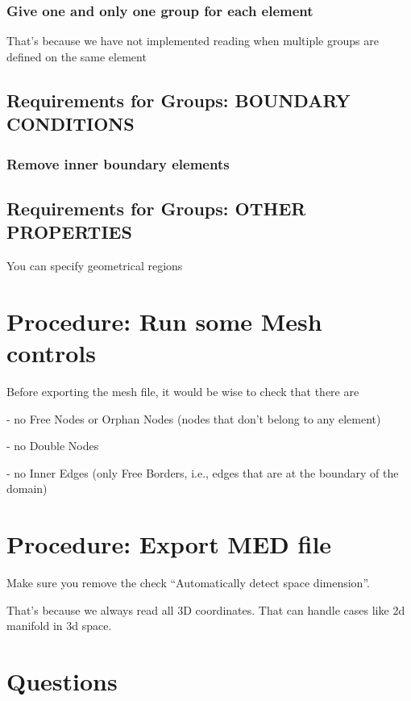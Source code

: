 \documentclass[10pt]{book}
\begin{document}
\subsection{Give one and only one group for each element}

 That's because we have not implemented reading when multiple groups are defined on the same element

\section{Requirements for Groups: BOUNDARY CONDITIONS}

   
\subsection{Remove inner boundary elements}

  
 \section{Requirements for Groups: OTHER PROPERTIES}
 
 You can specify geometrical regions
 
 
  
 \chapter{Procedure: Run some Mesh controls}
 
 Before exporting the mesh file, it would be wise to check that there are 
  
  - no Free Nodes or Orphan Nodes (nodes that don't belong to any element)
  
  - no Double Nodes
  
  - no Inner Edges (only Free Borders, i.e., edges that are at the boundary of the domain)
  
  
 \chapter{Procedure: Export MED file}
 
  Make sure you remove the check ``Automatically detect space dimension''.
  
  That's because we always read all 3D coordinates.
  That can handle cases like 2d manifold in 3d space.
  
  

 

 \chapter{Questions}
\end{document}
